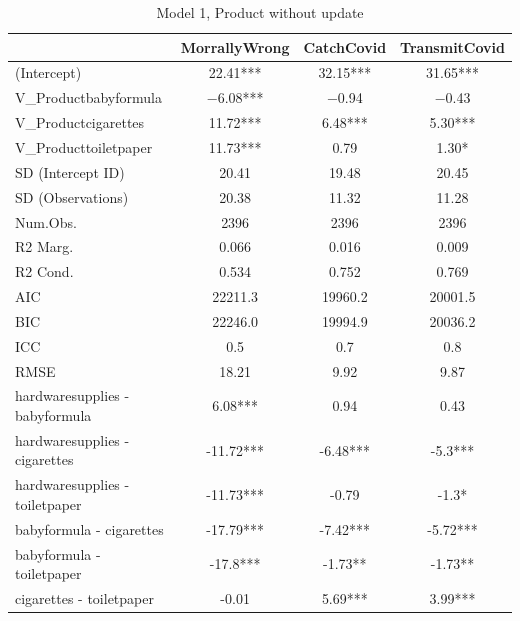 \documentclass[]{report}
\begin{document}
\begin{table}
	
	\caption{Model 1, Product without update}
	\centering
	\begin{tabular}[t]{lccc}
		\toprule
		& MorrallyWrong & CatchCovid & TransmitCovid\\
		\midrule
		(Intercept) & \num{22.41}*** & \num{32.15}*** & \num{31.65}***\\
		V\_Productbabyformula & \num{-6.08}*** & \num{-0.94} & \num{-0.43}\\
		V\_Productcigarettes & \num{11.72}*** & \num{6.48}*** & \num{5.30}***\\
		V\_Producttoiletpaper & \num{11.73}*** & \num{0.79} & \num{1.30}*\\
		SD (Intercept ID) & \num{20.41} & \num{19.48} & \num{20.45}\\
		SD (Observations) & \num{20.38} & \num{11.32} & \num{11.28}\\
		\midrule
		Num.Obs. & \num{2396} & \num{2396} & \num{2396}\\
		R2 Marg. & \num{0.066} & \num{0.016} & \num{0.009}\\
		R2 Cond. & \num{0.534} & \num{0.752} & \num{0.769}\\
		AIC & \num{22211.3} & \num{19960.2} & \num{20001.5}\\
		BIC & \num{22246.0} & \num{19994.9} & \num{20036.2}\\
		ICC & \num{0.5} & \num{0.7} & \num{0.8}\\
		RMSE & \num{18.21} & \num{9.92} & \num{9.87}\\
		\toprule
hardwaresupplies - babyformula & 6.08*** & 0.94 & 0.43 \\ 
hardwaresupplies - cigarettes & -11.72*** & -6.48*** & -5.3*** \\ 
hardwaresupplies - toiletpaper & -11.73*** & -0.79 & -1.3* \\ 
babyformula - cigarettes & -17.79*** & -7.42*** & -5.72*** \\ 
babyformula - toiletpaper & -17.8*** & -1.73** & -1.73** \\ 
cigarettes - toiletpaper & -0.01 & 5.69*** & 3.99*** \\ 
		\bottomrule
	\end{tabular}
\end{table}
\end{document}
